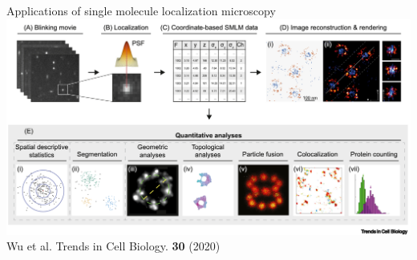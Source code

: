 \documentclass{beamer}					%
\begin{document}
\begin{frame}{Applications of single molecule localization microscopy}
\includegraphics[width=\textwidth]{../../dissertation/dissertation/media/Apps.png}
Wu et al. Trends in Cell Biology. \textbf{30} (2020)
\end{frame}

\end{document}
